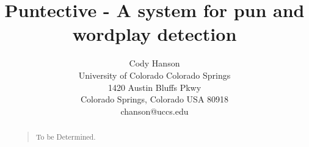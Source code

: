 \documentclass[letterpaper]{article}
\begin{document}
\title{Puntective - A system for pun and wordplay detection}
\author{Cody Hanson\\
University of Colorado Colorado Springs\\
1420 Austin Bluffs Pkwy\\
Colorado Springs, Colorado USA 80918\\
chanson@uccs.edu}
\maketitle
\begin{abstract}
\begin{quote}
To be Determined.
\end{quote}
\end{abstract}







 

\end{document}
